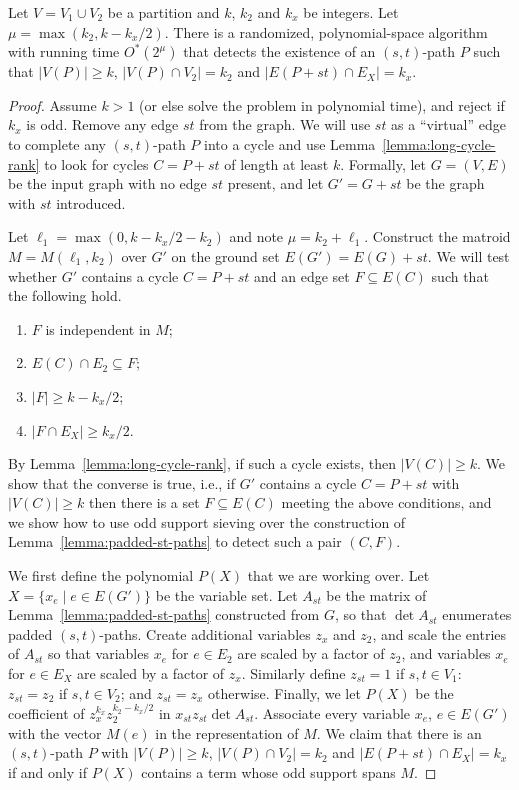 \documentclass{theoretics}
\begin{document}
\begin{lemma} \label{lemma:alg-longcycle}
  Let $V=V_1 \cup V_2$ be a partition and $k$, $k_2$ and $k_x$ be integers. 
  Let $\mu=\max(k_2, k-k_x/2)$. There is a randomized, polynomial-space
  algorithm with running time $O^*(2^\mu)$ that detects the existence
  of an $(s,t)$-path $P$ such that $|V(P)| \geq k$, $|V(P) \cap V_2|=k_2$
  and $|E(P+st) \cap E_X|=k_x$.
\end{lemma}
\begin{proof}
  Assume $k>1$ (or else solve the problem in polynomial time),
  and reject if $k_x$ is odd. Remove any edge $st$ from the graph.
  We will use $st$ as a ``virtual'' edge to complete any
  $(s,t)$-path $P$ into a cycle and use Lemma~\ref{lemma:long-cycle-rank} 
  to look for cycles $C=P+st$ of length at least $k$.
  Formally, let $G=(V,E)$ be the input graph with no edge $st$
  present, and let $G'=G+st$ be the graph with $st$ introduced. 
  
  Let $\ell_1=\max(0, k-k_x/2-k_2)$ and note $\mu=k_2+\ell_1$. 
  Construct the matroid $M=M(\ell_1,k_2)$ over $G'$ on the ground set
  $E(G')=E(G)+st$. We will test whether $G'$ contains a cycle $C=P+st$
  and an edge set $F \subseteq E(C)$ such that the following hold.
  \begin{enumerate}
  \item $F$ is independent in $M$;
  \item $E(C) \cap E_2 \subseteq F$;
  \item $|F| \geq k-k_x/2$;
  \item $|F \cap E_X| \geq k_x/2$.
  \end{enumerate}
  By Lemma~\ref{lemma:long-cycle-rank}, if such a cycle exists, then
  $|V(C)| \geq k$. We show that the converse is true, i.e., if $G'$
  contains a cycle $C=P+st$ with $|V(C)| \geq k$ then there is a set
  $F \subseteq E(C)$ meeting the above conditions, and we show how to 
  use odd support sieving over the construction of
  Lemma~\ref{lemma:padded-st-paths} to detect such a pair $(C,F)$. 

  We first define the polynomial $P(X)$ that we are working over.
  Let $X=\{x_e \mid e \in E(G')\}$ be the variable set.
  Let $A_{st}$ be the matrix of Lemma~\ref{lemma:padded-st-paths}
  constructed from $G$, so that $\det A_{st}$ enumerates padded $(s,t)$-paths.
  Create additional variables $z_x$ and $z_2$, and scale the entries
  of $A_{st}$ so that variables $x_e$ for $e \in E_2$ are scaled by a factor of $z_2$,
  and variables $x_e$ for $e \in E_X$ are scaled by a factor of $z_x$.
  Similarly define $z_{st}=1$ if $s, t \in V_1$:
  $z_{st}=z_2$ if $s, t \in V_2$; and $z_{st}=z_x$ otherwise.
  Finally, we let $P(X)$ be the coefficient of $z_x^{k_x} z_2^{k_2-k_x/2}$ 
  in $x_{st}z_{st} \det A_{st}$. Associate every variable $x_e$,
  $e \in E(G')$ with the vector $M(e)$ in the representation of $M$.
  We claim that there is an $(s,t)$-path $P$ with $|V(P)| \geq k$,
  $|V(P) \cap V_2|=k_2$ and $|E(P+st) \cap E_X|=k_x$
  if and only if $P(X)$ contains a term whose odd support spans $M$.


\end{proof}
\end{document}
